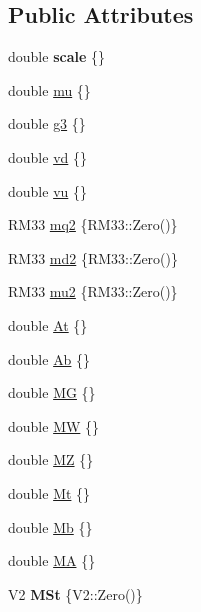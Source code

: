 \subsection*{Public Attributes}
\begin{DoxyCompactItemize}
\item 
double {\bfseries scale} \{\}\hypertarget{structhimalaya_1_1Parameters_a88f2975f66e3b8bc32f973606f2579c4}{}\label{structhimalaya_1_1Parameters_a88f2975f66e3b8bc32f973606f2579c4}

\item 
double \hyperlink{structhimalaya_1_1Parameters_ac3b46727f8e81adce0d984fe118ad8ba}{mu} \{\}
\item 
double \hyperlink{structhimalaya_1_1Parameters_a728fe0a5f7e390f3f165fbc536002296}{g3} \{\}
\item 
double \hyperlink{structhimalaya_1_1Parameters_a109a6a905bbc8963010571546dd2f11b}{vd} \{\}
\item 
double \hyperlink{structhimalaya_1_1Parameters_aa3c40d7f24703d8fba20e9b23ae95c4d}{vu} \{\}
\item 
R\+M33 \hyperlink{structhimalaya_1_1Parameters_a0df106ebf113926e6fa1c47ca0c3123e}{mq2} \{R\+M33\+::\+Zero()\}
\item 
R\+M33 \hyperlink{structhimalaya_1_1Parameters_a816c90360f6140e1f9c147efcdbe7ac2}{md2} \{R\+M33\+::\+Zero()\}
\item 
R\+M33 \hyperlink{structhimalaya_1_1Parameters_a2b2c94041a50cae06d1488dd403fec07}{mu2} \{R\+M33\+::\+Zero()\}
\item 
double \hyperlink{structhimalaya_1_1Parameters_a8843e5d6997fcf2af27eed6a18e86631}{At} \{\}
\item 
double \hyperlink{structhimalaya_1_1Parameters_a678741a0f129445f10e4baef797b1241}{Ab} \{\}
\item 
double \hyperlink{structhimalaya_1_1Parameters_a3d42cda935b85168742dcd960d667501}{MG} \{\}
\item 
double \hyperlink{structhimalaya_1_1Parameters_a901124ec812d32656ed0a1cc7b3ae07c}{MW} \{\}
\item 
double \hyperlink{structhimalaya_1_1Parameters_adab7c0a5e2ea82e8a6ce209e424e3254}{MZ} \{\}
\item 
double \hyperlink{structhimalaya_1_1Parameters_ad2b817fb45673b04ba2aac183b2719c3}{Mt} \{\}
\item 
double \hyperlink{structhimalaya_1_1Parameters_aa2e33485d4234974d0a93af49ea5df7d}{Mb} \{\}
\item 
double \hyperlink{structhimalaya_1_1Parameters_a8cd4adb5c71cd896e95f4e4873e1a125}{MA} \{\}
\item 
V2 {\bfseries M\+St} \{V2\+::\+Zero()\}\hypertarget{structhimalaya_1_1Parameters_a628b2a3f3c04ebc009a1f982dae144b9}{}\label{structhimalaya_1_1Parameters_a628b2a3f3c04ebc009a1f982dae144b9}


\end{DoxyCompactItemize}
